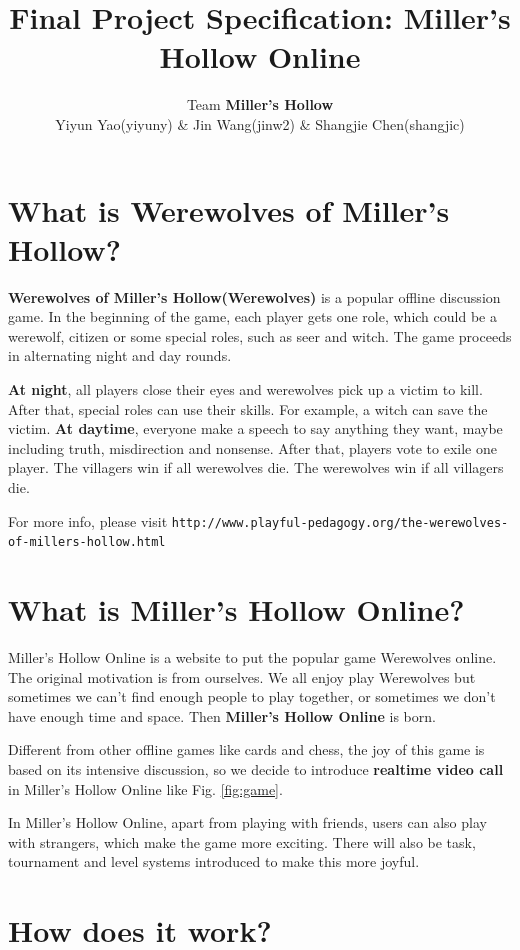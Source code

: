 \documentclass[11pt]{article}
\title{Final Project Specification: Miller's Hollow Online}
\author{Team \textbf{Miller's Hollow}
\\Yiyun Yao(yiyuny) \& Jin Wang(jinw2) \& Shangjie Chen(shangjic)}
\date{}                                           %
\begin{document}
\maketitle
\section{What is Werewolves of Miller's Hollow?}
\textbf{Werewolves of Miller's Hollow(Werewolves)} is a popular offline discussion game. In the beginning of the game, each player gets one role, which could be a werewolf, citizen or some special roles, such as seer and witch. The game proceeds in alternating night and day rounds.

\textbf{At night}, all players close their eyes and werewolves pick up a victim to kill. After that, special roles can use their skills. For example, a witch can save the victim. \textbf{At daytime}, everyone make a speech to say anything they want, maybe including truth, misdirection and nonsense. After that, players vote to exile one player. The villagers win if all werewolves die. The werewolves win if all villagers die.

For more info, please visit \verb|http://www.playful-pedagogy.org/the-werewolves-of-millers-hollow.html|

\section{What is Miller's Hollow Online?}
Miller's Hollow Online is a website to put the popular game Werewolves online. The original motivation is from ourselves. We all enjoy play Werewolves but sometimes we can't find enough people to play together, or sometimes we don't have enough time and space. Then \textbf{Miller's Hollow Online} is born.

Different from other offline games like cards and chess, the joy of this game is based on its intensive discussion, so we decide to introduce \textbf{realtime video call} in Miller's Hollow Online like Fig. \ref{fig:game}.

In Miller's Hollow Online, apart from playing with friends, users can also play with strangers, which make the game more exciting. There will also be task, tournament and level systems introduced to make this more joyful.

\section{How does it work?}
\end{document}
